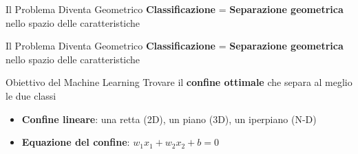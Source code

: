 \documentclass[aspectratio=169]{beamer}
\begin{document}
\begin{frame}{Il Problema Diventa Geometrico}
\textbf{Classificazione} = \textbf{Separazione geometrica} nello spazio delle caratteristiche

\vspace{0.5cm}

\begin{center}
\end{center}

\vspace{0.5cm}

\end{frame}
%
%
\begin{frame}{Il Problema Diventa Geometrico}
\textbf{Classificazione} = \textbf{Separazione geometrica} nello spazio delle caratteristiche
\vspace{0.5cm}
\begin{block}{Obiettivo del Machine Learning}
Trovare il \textbf{confine ottimale} che separa al meglio le due classi
\end{block}
\vspace{0.5cm}
\begin{itemize}
    \item \textbf{Confine lineare}: una retta (2D), un piano (3D), un iperpiano (N-D)
    \item \textbf{Equazione del confine}: $w_1 x_1 + w_2 x_2 + b = 0$
\end{itemize}
\end{frame}
%
\end{document}
